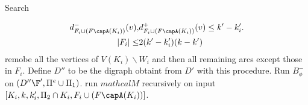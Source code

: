 \documentclass{beamer}
\begin{document}
\begin{frame}[allowframebreaks]{Search}
\begin{algorithmic}[1]
{\begin{align}
                        d^-_{F_i\cup(F\capA(K_i))}(v),&d^+_{F_i\cup(F\capA(K_i))}(v)\leq k'-k'_i.\\
                        |F_i|\leq &2(k'-k'_i)(k-k')
                    \end{align}}
                            \STATE remobe all the vertices of $V(K_i)\backslash W_i$ and then all remaining arcs except those in $F_i$.
                        \ENDFOR
                        \STATE Define $D''$ to be the digraph obtaint from $D'$ with this procedure.
                        \STATE Run $B_{\phi}^-$ on $(D''\F',\Pi^e\cup\Pi_1)$.
                            \STATE run $mathcal{M}$ recursively on input $[K_i,k,k'_i,\Pi_2\cap K_i,F_i\cup(F\capA(K_i))]$.
                        \ENDFOR 
                    \ENDFOR
                \ENDIF
            \ENDFOR 
        \end{algorithmic}
\end{frame}


%    

%    



\end{document}
